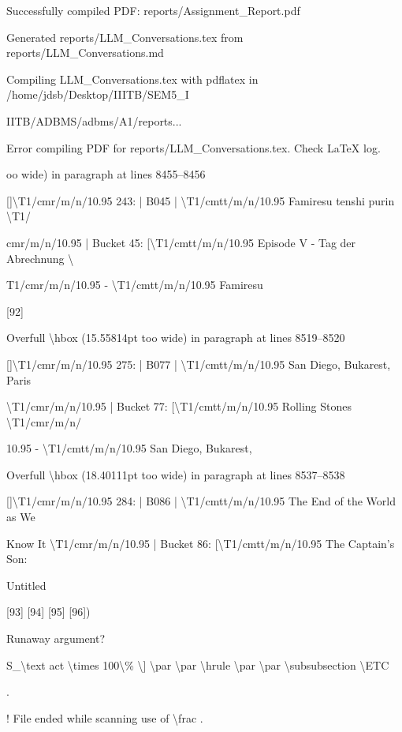 \documentclass[11pt,a4paper]{article}
\begin{document}
{Successfully compiled PDF: reports/Assignment\_Report.pdf

Generated reports/LLM\_Conversations.tex from reports/LLM\_Conversations.md

Compiling LLM\_Conversations.tex with pdflatex in /home/jdsb/Desktop/IIITB/SEM5\_I

IITB/ADBMS/adbms/A1/reports...

Error compiling PDF for reports/LLM\_Conversations.tex. Check LaTeX log.

oo wide) in paragraph at lines 8455--8456

[]\textbackslash{}T1/cmr/m/n/10.95 243: | B045 | \textbackslash{}T1/cmtt/m/n/10.95 Famiresu tenshi purin \textbackslash{}T1/

cmr/m/n/10.95 | Bucket 45: [\textbackslash{}T1/cmtt/m/n/10.95 Episode V - Tag der Abrechnung \textbackslash{}

T1/cmr/m/n/10.95 - \textbackslash{}T1/cmtt/m/n/10.95 Famiresu

[92]

Overfull \textbackslash{}hbox (15.55814pt too wide) in paragraph at lines 8519--8520

[]\textbackslash{}T1/cmr/m/n/10.95 275: | B077 | \textbackslash{}T1/cmtt/m/n/10.95 San Diego, Bukarest, Paris

\textbackslash{}T1/cmr/m/n/10.95 | Bucket 77: [\textbackslash{}T1/cmtt/m/n/10.95 Rolling Stones \textbackslash{}T1/cmr/m/n/

10.95 - \textbackslash{}T1/cmtt/m/n/10.95 San Diego, Bukarest,


Overfull \textbackslash{}hbox (18.40111pt too wide) in paragraph at lines 8537--8538

[]\textbackslash{}T1/cmr/m/n/10.95 284: | B086 | \textbackslash{}T1/cmtt/m/n/10.95 The End of the World as We

Know It \textbackslash{}T1/cmr/m/n/10.95 | Bucket 86: [\textbackslash{}T1/cmtt/m/n/10.95 The Captain's Son:

Untitled

[93] [94] [95] [96])

Runaway argument?

{S\_{\textbackslash{}text {act}} \textbackslash{}times 100\textbackslash{}\% \textbackslash{}] \textbackslash{}par \textbackslash{}par \textbackslash{}hrule \textbackslash{}par \textbackslash{}par \textbackslash{}subsubsection \textbackslash{}ETC

.

! File ended while scanning use of \textbackslash{}frac .

}}
\end{document}
